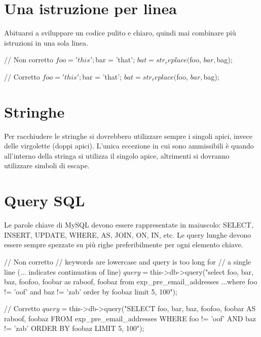 
\section*{Una istruzione per linea}
Abituarsi a sviluppare un codice pulito e chiaro, quindi mai combinare più istruzioni in una sola linea.

\begin{code}
// Non corretto
$foo = 'this'; $bar = 'that'; $bat = str_replace($foo, $bar, $bag);

// Corretto
$foo = 'this';
$bar = 'that';
$bat = str_replace($foo, $bar, $bag);
\end{code}

\section*{Stringhe}
Per racchiudere le stringhe si dovrebbero utilizzare sempre i singoli apici, invece delle virgolette (doppi apici). L'unica eccezione in cui sono ammissibili è quando all'interno della stringa si utilizza il singolo apice, altrimenti si dovranno utilizzare simboli di escape.


\section{Query SQL}
Le parole chiave di MySQL devono essere rappresentate in maiuscolo: SELECT, INSERT, UPDATE, WHERE, AS, JOIN, ON, IN, etc. Le query lunghe devono essere sempre spezzate su più righe preferibilmente per ogni elemento chiave.

\begin{code}
// Non corretto
// keywords are lowercase and query is too long for
// a single line (... indicates continuation of line)
$query = $this->db->query("select foo, bar, baz, foofoo, foobar as raboof, foobaz from exp_pre_email_addresses
...where foo != 'oof' and baz != 'zab' order by foobaz limit 5, 100");

// Corretto
$query = $this->db->query("SELECT foo, bar, baz, foofoo, foobar AS raboof, foobaz
				FROM exp_pre_email_addresses
				WHERE foo != 'oof'
				AND baz != 'zab'
				ORDER BY foobaz
				LIMIT 5, 100");
\end{code}

